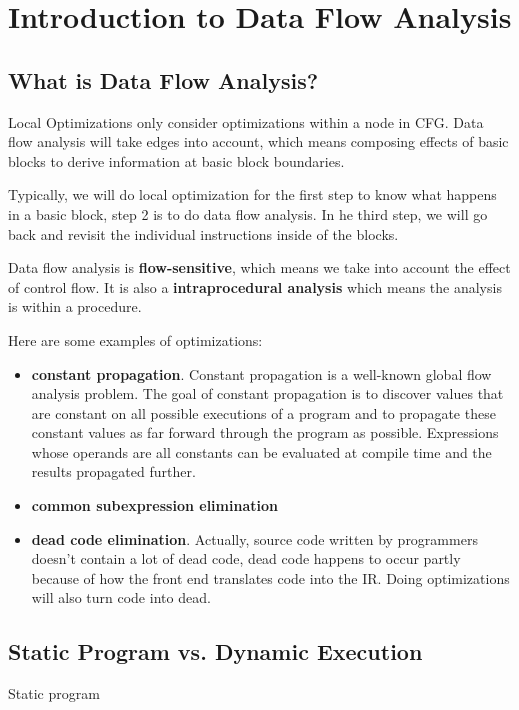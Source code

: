 \section{Introduction to Data Flow Analysis}


\subsection{What is Data Flow Analysis?}

Local Optimizations only consider optimizations within a node in CFG. 
Data flow analysis will take edges into account, which means composing 
effects of basic blocks to derive information at basic block boundaries.



Typically, we will do local optimization for the first step to know what happens in a 
basic block, step 2 is to do data flow analysis. In he third step, we will go back and 
revisit the individual instructions inside of the blocks.


Data flow analysis is \textbf{flow-sensitive}, which means we take into account
 the effect of control flow. It is also a \textbf{intraprocedural analysis} which means
 the analysis is within a procedure.

Here are some examples of optimizations:

\begin{itemize}
\item \textbf{constant propagation}. Constant propagation is a well-known global flow analysis 
problem. The goal of constant propagation is to discover values that are constant on all possible 
executions of a program and to propagate these constant values as far forward through the program 
as possible. Expressions whose operands are all constants can be evaluated at compile time and the 
results propagated further.

\item \textbf{common subexpression elimination}

\item \textbf{dead code elimination}. Actually, source code written by programmers doesn't contain
 a lot of dead code, dead code happens to occur partly because of how the front end translates code into 
 the IR. Doing optimizations will also turn code into dead.

\end{itemize}

\subsection{Static    Program    vs.    Dynamic    Execution }

Static program 


